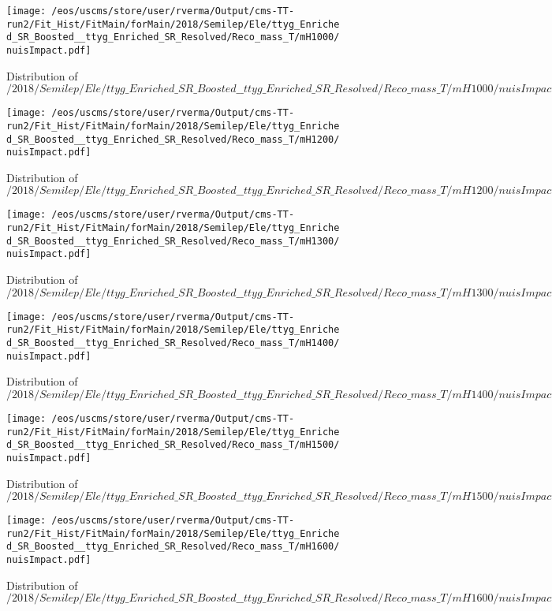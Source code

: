 \begin{figure}
\centering
\texttt{[image: /eos/uscms/store/user/rverma/Output/cms-TT-run2/Fit\_Hist/FitMain/forMain/2018/Semilep/Ele/ttyg\_Enriched\_SR\_Boosted\_\_ttyg\_Enriched\_SR\_Resolved/Reco\_mass\_T/mH1000/nuisImpact.pdf]}
\caption{Distribution of $/2018/Semilep/Ele/ttyg\_Enriched\_SR\_Boosted\_\_ttyg\_Enriched\_SR\_Resolved/Reco\_mass\_T/mH1000/nuisImpact.pdf$}
\end{figure}

\begin{figure}
\centering
\texttt{[image: /eos/uscms/store/user/rverma/Output/cms-TT-run2/Fit\_Hist/FitMain/forMain/2018/Semilep/Ele/ttyg\_Enriched\_SR\_Boosted\_\_ttyg\_Enriched\_SR\_Resolved/Reco\_mass\_T/mH1200/nuisImpact.pdf]}
\caption{Distribution of $/2018/Semilep/Ele/ttyg\_Enriched\_SR\_Boosted\_\_ttyg\_Enriched\_SR\_Resolved/Reco\_mass\_T/mH1200/nuisImpact.pdf$}
\end{figure}

\begin{figure}
\centering
\texttt{[image: /eos/uscms/store/user/rverma/Output/cms-TT-run2/Fit\_Hist/FitMain/forMain/2018/Semilep/Ele/ttyg\_Enriched\_SR\_Boosted\_\_ttyg\_Enriched\_SR\_Resolved/Reco\_mass\_T/mH1300/nuisImpact.pdf]}
\caption{Distribution of $/2018/Semilep/Ele/ttyg\_Enriched\_SR\_Boosted\_\_ttyg\_Enriched\_SR\_Resolved/Reco\_mass\_T/mH1300/nuisImpact.pdf$}
\end{figure}

\begin{figure}
\centering
\texttt{[image: /eos/uscms/store/user/rverma/Output/cms-TT-run2/Fit\_Hist/FitMain/forMain/2018/Semilep/Ele/ttyg\_Enriched\_SR\_Boosted\_\_ttyg\_Enriched\_SR\_Resolved/Reco\_mass\_T/mH1400/nuisImpact.pdf]}
\caption{Distribution of $/2018/Semilep/Ele/ttyg\_Enriched\_SR\_Boosted\_\_ttyg\_Enriched\_SR\_Resolved/Reco\_mass\_T/mH1400/nuisImpact.pdf$}
\end{figure}

\begin{figure}
\centering
\texttt{[image: /eos/uscms/store/user/rverma/Output/cms-TT-run2/Fit\_Hist/FitMain/forMain/2018/Semilep/Ele/ttyg\_Enriched\_SR\_Boosted\_\_ttyg\_Enriched\_SR\_Resolved/Reco\_mass\_T/mH1500/nuisImpact.pdf]}
\caption{Distribution of $/2018/Semilep/Ele/ttyg\_Enriched\_SR\_Boosted\_\_ttyg\_Enriched\_SR\_Resolved/Reco\_mass\_T/mH1500/nuisImpact.pdf$}
\end{figure}

\begin{figure}
\centering
\texttt{[image: /eos/uscms/store/user/rverma/Output/cms-TT-run2/Fit\_Hist/FitMain/forMain/2018/Semilep/Ele/ttyg\_Enriched\_SR\_Boosted\_\_ttyg\_Enriched\_SR\_Resolved/Reco\_mass\_T/mH1600/nuisImpact.pdf]}
\caption{Distribution of $/2018/Semilep/Ele/ttyg\_Enriched\_SR\_Boosted\_\_ttyg\_Enriched\_SR\_Resolved/Reco\_mass\_T/mH1600/nuisImpact.pdf$}
\end{figure}

